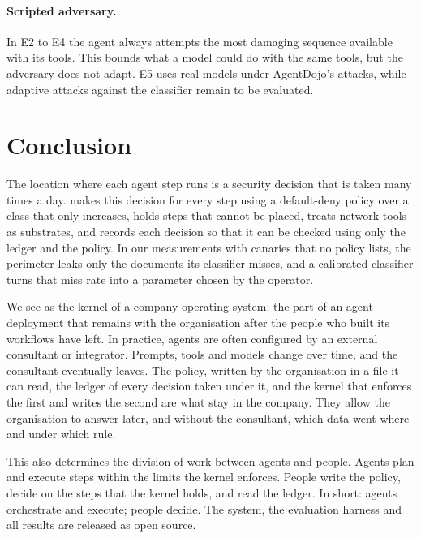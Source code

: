 \paragraph{Scripted adversary.} In E2 to E4 the agent always attempts the most damaging
sequence available with its tools. This bounds what a model could do with the same tools, but
the adversary does not adapt. E5 uses real models under AgentDojo's attacks, while adaptive
attacks against the classifier remain to be evaluated.

\section{Conclusion}

The location where each agent step runs is a security decision that is taken many times a day.
\annona{} makes this decision for every step using a default-deny policy over a class that only
increases, holds steps that cannot be placed, treats network tools as substrates, and records
each decision so that it can be checked using only the ledger and the policy. In our
measurements with canaries that no policy lists, the perimeter leaks only the documents its
classifier misses, and a calibrated classifier turns that miss rate into a parameter chosen by
the operator.

We see \annona{} as the kernel of a company operating system: the part of an agent deployment
that remains with the organisation after the people who built its workflows have left. In
practice, agents are often configured by an external consultant or integrator. Prompts, tools
and models change over time, and the consultant eventually leaves. The policy, written by the
organisation in a file it can read, the ledger of every decision taken under it, and the kernel
that enforces the first and writes the second are what stay in the company. They allow the
organisation to answer later, and without the consultant, which data went where and under which
rule.

This also determines the division of work between agents and people. Agents plan and execute
steps within the limits the kernel enforces. People write the policy, decide on the steps that
the kernel holds, and read the ledger. In short: agents orchestrate and execute; people decide.
The system, the evaluation harness and all results are released as open source.
